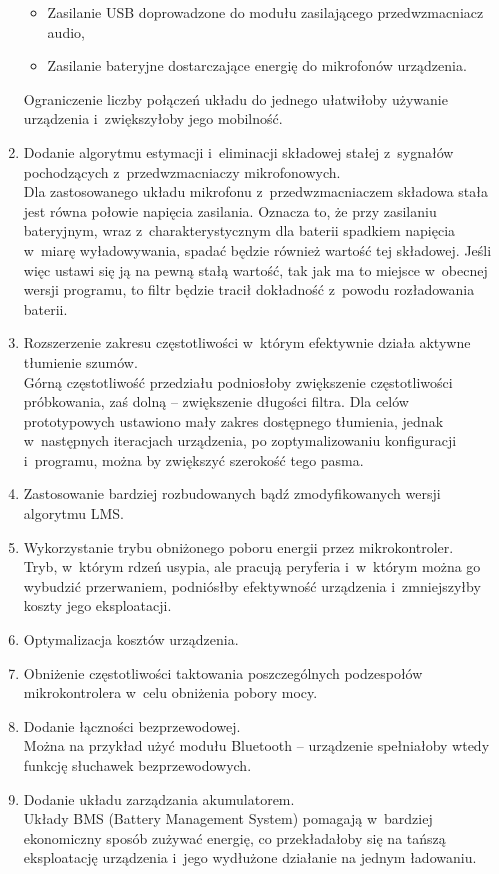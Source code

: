 \begin{enumerate}
\begin{itemize}
	\item Zasilanie USB doprowadzone do modułu zasilającego przedwzmacniacz audio,
	\item Zasilanie bateryjne dostarczające energię do mikrofonów urządzenia.
	\end{itemize}
	Ograniczenie liczby połączeń układu do jednego ułatwiłoby używanie urządzenia i~zwiększyłoby jego mobilność.
	\item Dodanie algorytmu estymacji i~eliminacji składowej stałej z~sygnałów pochodzących z~przedwzmacniaczy mikrofonowych.\\
	Dla zastosowanego układu mikrofonu z~przedwzmacniaczem składowa stała jest równa połowie napięcia zasilania. Oznacza to, że przy zasilaniu bateryjnym, wraz z~charakterystycznym dla baterii spadkiem napięcia w~miarę wyładowywania, spadać będzie również wartość tej składowej. Jeśli więc ustawi się ją na pewną stałą wartość, tak jak ma to miejsce w~obecnej wersji programu, to filtr będzie tracił dokładność z~powodu rozładowania baterii.
	\item Rozszerzenie zakresu częstotliwości w~którym efektywnie działa aktywne tłumienie szumów.\\
	Górną częstotliwość przedziału podniosłoby zwiększenie częstotliwości próbkowania, zaś dolną -- zwiększenie długości filtra. Dla celów prototypowych ustawiono mały zakres dostępnego tłumienia, jednak w~następnych iteracjach urządzenia, po zoptymalizowaniu konfiguracji i~programu, można by zwiększyć szerokość tego pasma.
	\item Zastosowanie bardziej rozbudowanych bądź zmodyfikowanych wersji algorytmu LMS.
	\item Wykorzystanie trybu obniżonego poboru energii przez mikrokontroler.\\
	Tryb, w~którym rdzeń usypia, ale pracują peryferia i~w~którym można go wybudzić przerwaniem, podniósłby efektywność urządzenia i~zmniejszyłby koszty jego eksploatacji.
	\item Optymalizacja kosztów urządzenia.
	\item Obniżenie częstotliwości taktowania poszczególnych podzespołów mikrokontrolera w~celu obniżenia pobory mocy.
	\item Dodanie łączności bezprzewodowej.\\
	Można  na przykład użyć modułu Bluetooth -- urządzenie spełniałoby wtedy funkcję słuchawek bezprzewodowych.
	\item Dodanie układu zarządzania akumulatorem.\\
	Układy BMS (Battery Management System) pomagają w~bardziej ekonomiczny sposób zużywać energię, co przekładałoby się na tańszą eksploatację urządzenia i~jego wydłużone działanie na jednym ładowaniu.
\end{enumerate}

